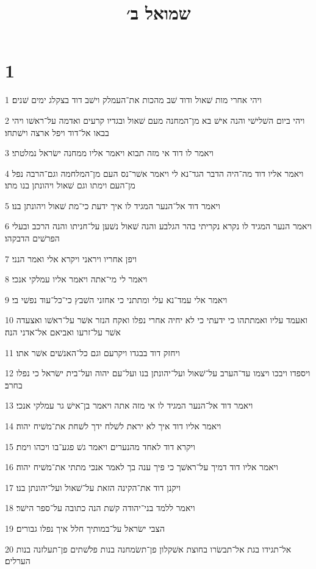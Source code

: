 

\title{שמואל ב׳}


\chapter{1}

\par 1 ויהי אחרי מות שׁאול ודוד שׁב מהכות את־העמלק וישׁב דוד בצקלג ימים שׁנים׃
\par 2 ויהי ביום השׁלישׁי והנה אישׁ בא מן־המחנה מעם שׁאול ובגדיו קרעים ואדמה על־ראשׁו ויהי בבאו אל־דוד ויפל ארצה וישׁתחו׃
\par 3 ויאמר לו דוד אי מזה תבוא ויאמר אליו ממחנה ישׂראל נמלטתי׃
\par 4 ויאמר אליו דוד מה־היה הדבר הגד־נא לי ויאמר אשׁר־נס העם מן־המלחמה וגם־הרבה נפל מן־העם וימתו וגם שׁאול ויהונתן בנו מתו׃
\par 5 ויאמר דוד אל־הנער המגיד לו איך ידעת כי־מת שׁאול ויהונתן בנו׃
\par 6 ויאמר הנער המגיד לו נקרא נקריתי בהר הגלבע והנה שׁאול נשׁען על־חניתו והנה הרכב ובעלי הפרשׁים הדבקהו׃
\par 7 ויפן אחריו ויראני ויקרא אלי ואמר הנני׃
\par 8 ויאמר לי מי־אתה ויאמר אליו עמלקי אנכי׃
\par 9 ויאמר אלי עמד־נא עלי ומתתני כי אחזני השׁבץ כי־כל־עוד נפשׁי בי׃
\par 10 ואעמד עליו ואמתתהו כי ידעתי כי לא יחיה אחרי נפלו ואקח הנזר אשׁר על־ראשׁו ואצעדה אשׁר על־זרעו ואביאם אל־אדני הנה׃
\par 11 ויחזק דוד בבגדו ויקרעם וגם כל־האנשׁים אשׁר אתו׃
\par 12 ויספדו ויבכו ויצמו עד־הערב על־שׁאול ועל־יהונתן בנו ועל־עם יהוה ועל־בית ישׂראל כי נפלו בחרב׃
\par 13 ויאמר דוד אל־הנער המגיד לו אי מזה אתה ויאמר בן־אישׁ גר עמלקי אנכי׃
\par 14 ויאמר אליו דוד איך לא יראת לשׁלח ידך לשׁחת את־משׁיח יהוה׃
\par 15 ויקרא דוד לאחד מהנערים ויאמר גשׁ פגע־בו ויכהו וימת׃
\par 16 ויאמר אליו דוד דמיך על־ראשׁך כי פיך ענה בך לאמר אנכי מתתי את־משׁיח יהוה׃
\par 17 ויקנן דוד את־הקינה הזאת על־שׁאול ועל־יהונתן בנו׃
\par 18 ויאמר ללמד בני־יהודה קשׁת הנה כתובה על־ספר הישׁר׃
\par 19 הצבי ישׂראל על־במותיך חלל איך נפלו גבורים׃
\par 20 אל־תגידו בגת אל־תבשׂרו בחוצת אשׁקלון פן־תשׂמחנה בנות פלשׁתים פן־תעלזנה בנות הערלים׃
